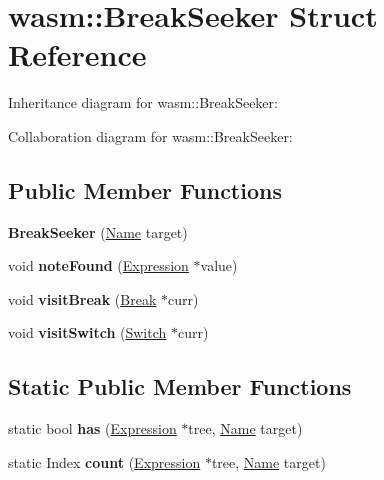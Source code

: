 \hypertarget{structwasm_1_1_break_seeker}{}\section{wasm\+:\+:Break\+Seeker Struct Reference}
\label{structwasm_1_1_break_seeker}


Inheritance diagram for wasm\+:\+:Break\+Seeker\+:


Collaboration diagram for wasm\+:\+:Break\+Seeker\+:
\subsection*{Public Member Functions}
\begin{DoxyCompactItemize}
\item 
\mbox{\label{structwasm_1_1_break_seeker_ab78a1964642f4e42ba6dc75f4fe28f7f}} 
{\bfseries Break\+Seeker} (\mbox{\hyperlink{structwasm_1_1_name}{Name}} target)
\item 
\mbox{\label{structwasm_1_1_break_seeker_a4cca9d988d81f5b684055d34e8a6a7a0}} 
void {\bfseries note\+Found} (\mbox{\hyperlink{classwasm_1_1_expression}{Expression}} $\ast$value)
\item 
\mbox{\label{structwasm_1_1_break_seeker_aed76a047d635bcc6663722298772f6e3}} 
void {\bfseries visit\+Break} (\mbox{\hyperlink{classwasm_1_1_break}{Break}} $\ast$curr)
\item 
\mbox{\label{structwasm_1_1_break_seeker_a6c165a9282c88a91abe351c8bd58b5f0}} 
void {\bfseries visit\+Switch} (\mbox{\hyperlink{classwasm_1_1_switch}{Switch}} $\ast$curr)
\end{DoxyCompactItemize}
\subsection*{Static Public Member Functions}
\begin{DoxyCompactItemize}
\item 
\mbox{\label{structwasm_1_1_break_seeker_ac7d90df8f8cc7c5fa5b44da88eb2123f}} 
static bool {\bfseries has} (\mbox{\hyperlink{classwasm_1_1_expression}{Expression}} $\ast$tree, \mbox{\hyperlink{structwasm_1_1_name}{Name}} target)
\item 
\mbox{\label{structwasm_1_1_break_seeker_a5d01cad70e2e2dad471c0ab7bf71a9dd}} 
static Index {\bfseries count} (\mbox{\hyperlink{classwasm_1_1_expression}{Expression}} $\ast$tree, \mbox{\hyperlink{structwasm_1_1_name}{Name}} target)
\end{DoxyCompactItemize}
